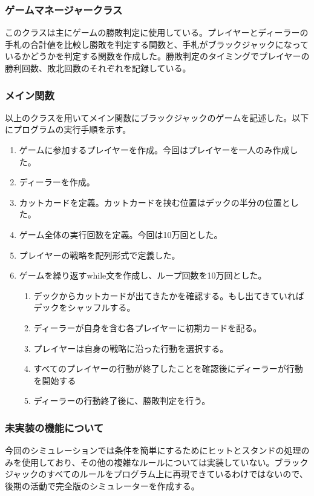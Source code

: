 \subsubsection{ゲームマネージャークラス}
このクラスは主にゲームの勝敗判定に使用している。プレイヤーとディーラーの手札の合計値を比較し勝敗を判定する関数と、手札がブラックジャックになっているかどうかを判定する関数を作成した。勝敗判定のタイミングでプレイヤーの勝利回数、敗北回数のそれぞれを記録している。

\subsubsection{メイン関数}
以上のクラスを用いてメイン関数にブラックジャックのゲームを記述した。以下にプログラムの実行手順を示す。
\begin{enumerate}
    \item ゲームに参加するプレイヤーを作成。今回はプレイヤーを一人のみ作成した。
    \item ディーラーを作成。
    \item カットカードを定義。カットカードを挟む位置はデックの半分の位置とした。
    \item ゲーム全体の実行回数を定義。今回は10万回とした。
    \item プレイヤーの戦略を配列形式で定義した。
    \item ゲームを繰り返すwhile文を作成し、ループ回数を10万回とした。
    \begin{enumerate}
        \item デックからカットカードが出てきたかを確認する。もし出てきていればデックをシャッフルする。
	  \item ディーラーが自身を含む各プレイヤーに初期カードを配る。
	  \item プレイヤーは自身の戦略に沿った行動を選択する。
	  \item すべてのプレイヤーの行動が終了したことを確認後にディーラーが行動を開始する
	  \item ディーラーの行動終了後に、勝敗判定を行う。
    \end{enumerate}
\end{enumerate}

\subsubsection{未実装の機能について}
今回のシミュレーションでは条件を簡単にするためにヒットとスタンドの処理のみを使用しており、その他の複雑なルールについては実装していない。ブラックジャックのすべてのルールをプログラム上に再現できているわけではないので、後期の活動で完全版のシミュレーターを作成する。


